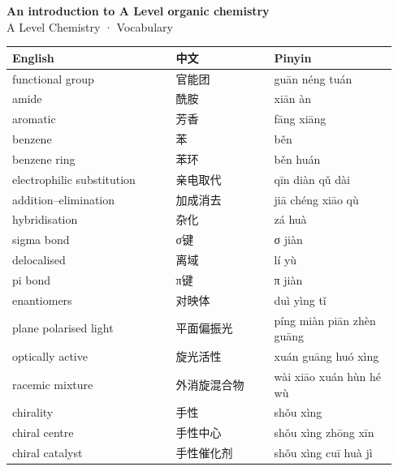 \documentclass[11pt]{article}
\begin{document}
\begin{center}
  {\LARGE\bfseries An introduction to A Level organic chemistry}\\[0.35em]
  {\large A Level Chemistry · Vocabulary}
\end{center}
\vspace{0.6em}

\begin{longtable}{@{}p{0.40\linewidth}p{0.24\linewidth}p{0.30\linewidth}@{}}
\toprule
\textbf{English} & \textbf{中文} & \textbf{Pinyin} \\
\midrule
\endhead
\bottomrule
\endlastfoot
functional group & 官能团 & guān néng tuán \\
amide & 酰胺 & xiān àn \\
aromatic & 芳香 & fāng xiāng \\
benzene & 苯 & běn \\
benzene ring & 苯环 & běn huán \\
electrophilic substitution & 亲电取代 & qīn diàn qǔ dài \\
addition–elimination & 加成消去 & jiā chéng xiāo qù \\
hybridisation & 杂化 & zá huà \\
sigma bond & σ键 & σ jiàn \\
delocalised & 离域 & lí yù \\
pi bond & π键 & π jiàn \\
enantiomers & 对映体 & duì yìng tǐ \\
plane polarised light & 平面偏振光 & píng miàn piān zhèn guāng \\
optically active & 旋光活性 & xuán guāng huó xìng \\
racemic mixture & 外消旋混合物 & wài xiāo xuán hùn hé wù \\
chirality & 手性 & shǒu xìng \\
chiral centre & 手性中心 & shǒu xìng zhōng xīn \\
chiral catalyst & 手性催化剂 & shǒu xìng cuī huà jì \\
\end{longtable}
\end{document}
